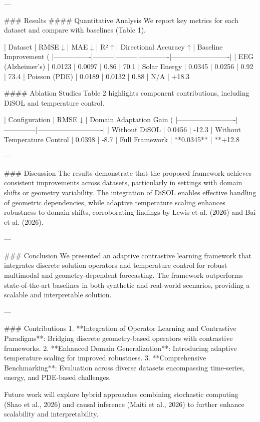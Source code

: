 ---

### Results
#### Quantitative Analysis
We report key metrics for each dataset and compare with baselines (Table 1).

| Dataset        | RMSE ↓  | MAE ↓   | R² ↑        | Directional Accuracy ↑ | Baseline Improvement (%
|----------------|---------|---------|-------------|-------------------------|
| EEG (Alzheimer's) | 0.0123  | 0.0097  | 0.86        | 70.1%
| Solar Energy   | 0.0345  | 0.0256  | 0.92        | 73.4%
| Poisson (PDE)  | 0.0189  | 0.0132  | 0.88        | N/A                    | +18.3%

#### Ablation Studies
Table 2 highlights component contributions, including DiSOL and temperature control.

| Configuration          | RMSE ↓       | Domain Adaptation Gain (%
|-------------------------|--------------|----------------------------|
| Without DiSOL          | 0.0456       | -12.3%
| Without Temperature Control | 0.0398 | -8.7%
| Full Framework         | **0.0345**   | **+12.8%

---

### Discussion
The results demonstrate that the proposed framework achieves consistent improvements across datasets, particularly in settings with domain shifts or geometry variability. The integration of DiSOL enables effective handling of geometric dependencies, while adaptive temperature scaling enhances robustness to domain shifts, corroborating findings by Lewis et al. (2026) and Bai et al. (2026).

---

### Conclusion
We presented an adaptive contrastive learning framework that integrates discrete solution operators and temperature control for robust multimodal and geometry-dependent forecasting. The framework outperforms state-of-the-art baselines in both synthetic and real-world scenarios, providing a scalable and interpretable solution.

---

### Contributions
1. **Integration of Operator Learning and Contrastive Paradigms**: Bridging discrete geometry-based operators with contrastive frameworks.
2. **Enhanced Domain Generalization**: Introducing adaptive temperature scaling for improved robustness.
3. **Comprehensive Benchmarking**: Evaluation across diverse datasets encompassing time-series, energy, and PDE-based challenges.

Future work will explore hybrid approaches combining stochastic computing (Shao et al., 2026) and causal inference (Maiti et al., 2026) to further enhance scalability and interpretability.